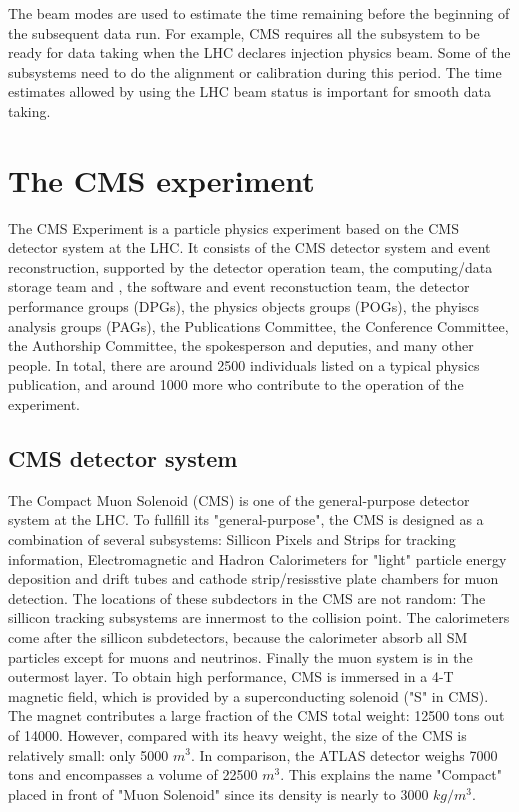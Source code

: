 The beam modes are used to estimate the time remaining before the beginning of the subsequent data run. For example, CMS requires all the subsystem to be ready for data taking when the LHC declares injection physics beam. Some of the subsystems need to do the alignment or calibration during this period. The time estimates allowed by using the LHC beam status is important for smooth data taking.

\clearpage
\section{The CMS experiment}

The CMS Experiment is a particle physics experiment based on the CMS detector system at the LHC. It consists of the CMS detector system and event reconstruction, supported by the detector operation team, the computing/data storage team and , the software and event reconstuction team, the detector performance groups (DPGs), the physics objects groups (POGs), the phyiscs analysis groups (PAGs), the Publications Committee, the Conference Committee, the Authorship Committee, the spokesperson and deputies, and many other people.  In total, there are around 2500 individuals listed on a typical physics publication, and around 1000 more who contribute to the operation of the experiment.

\clearpage
\subsection{CMS detector system}

The Compact Muon Solenoid (CMS) is one of the general-purpose detector system at the LHC. To fullfill its "general-purpose", the CMS is designed as a combination of several subsystems: Sillicon Pixels and Strips for tracking information, Electromagnetic and Hadron Calorimeters for "light" particle energy deposition and drift tubes and cathode strip/resisstive plate chambers for muon detection. The locations of these subdectors in the CMS are not random: The sillicon tracking subsystems are innermost to the collision point. The calorimeters come after the sillicon subdetectors, because the calorimeter absorb all SM particles except for muons and neutrinos. Finally the muon system is in the outermost layer. To obtain high performance, CMS is immersed in a 4-T magnetic field, which is provided by a superconducting solenoid ("S" in CMS). The magnet contributes a large fraction of the CMS total weight: 12500 tons out of 14000. However, compared with its heavy weight, the size of the CMS is relatively small: only 5000 $m^{3}$. In comparison, the ATLAS detector weighs 7000 tons and encompasses a volume of 22500 $m^{3}$. This explains the name "Compact" placed in front of "Muon Solenoid" since its density is nearly to 3000 $kg/m^{3}$.

